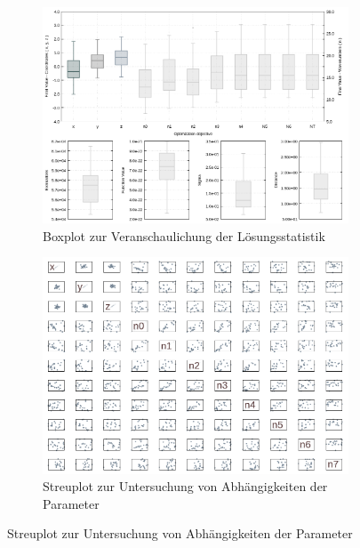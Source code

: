\begin{landscape}
\begin{figure}[!ht]
\begin{subfigure}[t]{0.45\textheight}
	\end{subfigure}
	\qquad
	\begin{subfigure}[t]{0.45\textheight}
		\centering
	     \includegraphics[width=\textwidth]{img/evo/boxes4089.png}
	     	    \caption{Boxplot zur Veranschaulichung der Lösungsstatistik }
	\end{subfigure}
	\qquad
	\begin{subfigure}[t]{0.45\textheight}
			\centering
	   \includegraphics[width=\textwidth]{img/evo/Scatter4089.png}
	   	       \caption{Streuplot zur Untersuchung von Abhängigkeiten der Parameter}
	\end{subfigure}

\end{figure}
\newpage
\end{landscape}
